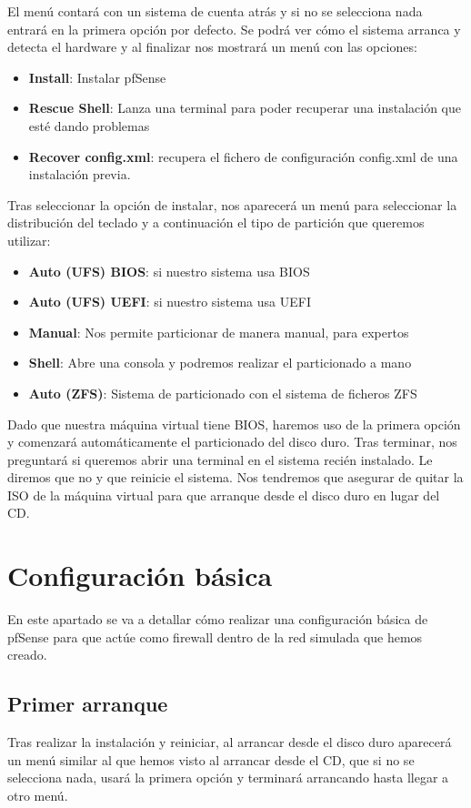 El menú contará con un sistema de cuenta atrás y si no se selecciona nada entrará en la primera opción por defecto. Se podrá ver cómo el sistema arranca y detecta el  hardware y al finalizar nos mostrará un menú con las opciones:

\begin{itemize}
    \item \textbf{Install}: Instalar pfSense
    \item \textbf{Rescue Shell}: Lanza una terminal para poder recuperar una instalación que esté dando problemas
    \item \textbf{Recover config.xml}: recupera el fichero de configuración config.xml de una instalación previa.
\end{itemize}
Tras seleccionar la opción de instalar, nos aparecerá un menú para seleccionar la distribución del teclado y a continuación el tipo de partición que queremos utilizar:

\begin{itemize}
    \item \textbf{Auto (UFS) BIOS}: si nuestro sistema usa BIOS
    \item \textbf{Auto (UFS) UEFI}: si nuestro sistema usa UEFI
    \item \textbf{Manual}: Nos permite particionar de manera manual, para expertos
    \item \textbf{Shell}: Abre una consola y podremos realizar el particionado a mano
    \item \textbf{Auto (ZFS)}: Sistema de particionado con el sistema de ficheros ZFS
\end{itemize}

Dado que nuestra máquina virtual tiene BIOS, haremos uso de la primera opción y comenzará automáticamente el particionado del disco duro. Tras terminar, nos preguntará si queremos abrir una terminal en el sistema recién instalado. Le diremos que no y que reinicie el sistema. Nos tendremos que asegurar de quitar la ISO de la máquina virtual para que arranque desde el disco duro en lugar del CD.


\chapter{Configuración básica}
En este apartado se va a detallar cómo realizar una configuración básica de pfSense para que actúe como firewall dentro de la red simulada que hemos creado.


\section{Primer arranque}
Tras realizar la instalación y reiniciar, al arrancar  desde el disco duro aparecerá un menú similar al que hemos visto al arrancar desde el CD, que si no se selecciona nada, usará la primera opción y terminará arrancando hasta llegar a otro menú.

